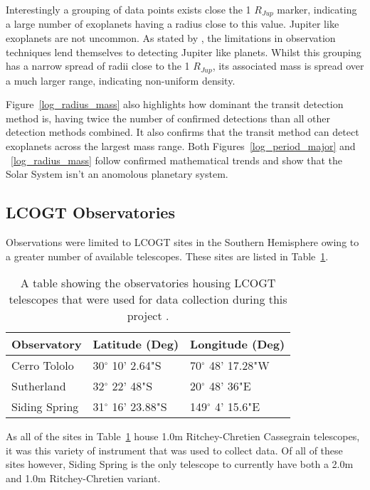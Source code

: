 \documentclass{report}
\begin{document}
 Interestingly a grouping of data points exists close the 1 $R_{Jup}$ marker, indicating a large number of exoplanets having a radius close to this value. Jupiter like exoplanets are not uncommon. As stated by \textcite{stats}, the limitations in observation techniques lend themselves to detecting Jupiter like planets. Whilst this grouping has a narrow spread of radii close to the 1 $R_{Jup}$, its associated mass is spread over a much larger range, indicating non-uniform density.

 Figure~\ref{log_radius_mass} also highlights how dominant the transit detection method is, having twice the number of confirmed detections than all other detection methods combined. It also confirms that the transit method can detect exoplanets across the largest mass range. Both Figures~\ref{log_period_major} and ~\ref{log_radius_mass} follow confirmed mathematical trends and show that the Solar System isn't an anomolous planetary system.


\subsection{LCOGT Observatories}
Observations were limited to LCOGT sites in the Southern Hemisphere owing to a greater number of available telescopes. These sites are listed in Table~\ref{observatory}.

\begin{table}[H]
    \centering
    \begin{tabular}{ | l | l | l | }
    \hline \hline
    Observatory & Latitude (Deg) & Longitude (Deg)       \\ \hline \hline
    Cerro Tololo    & 30$^\circ$ 10' 2.64"S & 70$^\circ$ 48' 17.28"W  \\
    Sutherland   & 32$^\circ$ 22' 48"S & 20$^\circ$ 48' 36"E  \\
    Siding Spring  & 31$^\circ$ 16' 23.88"S & 149$^\circ$ 4' 15.6"E \\
    \hline
    \end{tabular}
    \caption{A table showing the observatories housing LCOGT telescopes that were used for data collection during this project \parencite{sites}.}
    \label{observatory}
\end{table}

As all of the sites in Table~\ref{observatory} house 1.0m Ritchey-Chretien Cassegrain telescopes, it was this variety of instrument that was used to collect data. Of all of these sites however, Siding Spring is the only telescope to currently have both a 2.0m and 1.0m Ritchey-Chretien variant. 
\end{document}
